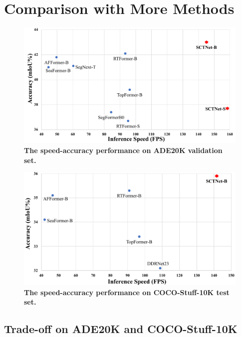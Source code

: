 \documentclass[letterpaper]{article} %
\begin{document}
\section{Comparison with More Methods}\label{section:C}

\begin{figure}[tb]
\begin{center}
   \includegraphics[width=1.0\linewidth]{./image/supp/sup-ADE-trade-off.pdf}
\end{center}
   \caption{\textbf{The speed-accuracy performance on ADE20K validation set.} }
\label{suppfig:ADE_trade-off}
\end{figure}

\begin{figure}[tb]
\begin{center}
   \includegraphics[width=1.0\linewidth]{./image/supp/sup-COCO-trade-off.pdf}
\end{center}
   \caption{\textbf{The speed-accuracy performance on COCO-Stuff-10K test set.} }
\label{suppfig:COCO_trade-off}
\end{figure}

\subsection{Trade-off on ADE20K and COCO-Stuff-10K}\label{app:sec:ade-coco-tradeoff}
\end{document}
